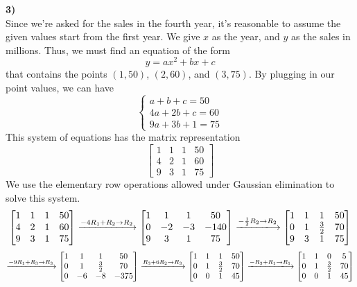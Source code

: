 \documentclass{article}
\begin{document}
\noindent\textbf{3)}\vspace{3mm}\\ 
Since we're asked for the sales in the fourth year, it's reasonable to assume the given values start from the first year. We give $x$ as the year, and $y$ as the sales in millions. Thus, we must find an equation of the form
$$y=ax^2+bx+c$$
that contains the points $(1,50)$, $(2,60)$, and $(3,75)$. By plugging in our point values, we can have
$$\left\{
\begin{array}{c}
	a+b+c=50\\
	4a+2b+c=60\\
	9a+3b+1=75
\end{array}\right.$$
This system of equations has the matrix representation
$$\begin{bmatrix}1&1&1&50\\4&2&1&60\\9&3&1&75\end{bmatrix}$$
We use the elementary row operations allowed under Gaussian elimination to solve this system.
$$\begin{bmatrix}1&1&1&50\\4&2&1&60\\9&3&1&75\end{bmatrix}\xlongrightarrow{-4R_1+R_2\rightarrow R_2}\begin{bmatrix}1&1&1&50\\0&-2&-3&-140\\9&3&1&75\end{bmatrix}\xlongrightarrow{-\frac{1}{2}R_2\rightarrow R_2}\begin{bmatrix}1&1&1&50\\0&1&\frac{3}{2}&70\\9&3&1&75\end{bmatrix}$$
$$\xlongrightarrow{-9R_1+R_3\rightarrow R_3}\begin{bmatrix}1&1&1&50\\0&1&\frac{3}{2}&70\\0&-6&-8&-375\end{bmatrix}\xlongrightarrow{R_3+6R_2\rightarrow R_3}\begin{bmatrix}1&1&1&50\\0&1&\frac{3}{2}&70\\0&0&1&45\end{bmatrix}\xlongrightarrow{-R_3+R_1\rightarrow R_1}\begin{bmatrix}1&1&0&5\\0&1&\frac{3}{2}&70\\0&0&1&45\end{bmatrix}$$
\end{document}
